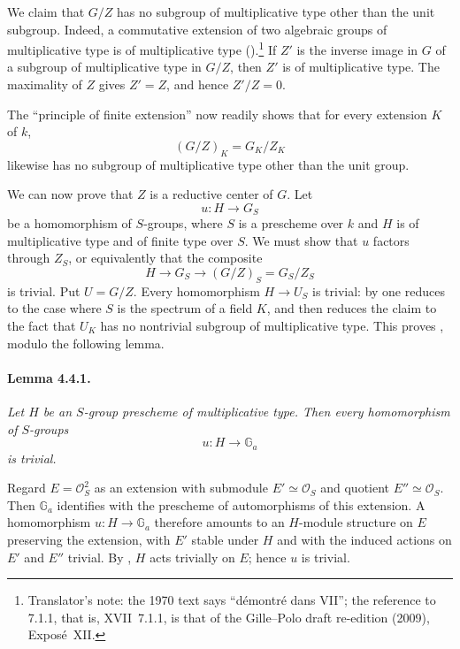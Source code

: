 We claim that \(G/Z\) has no subgroup of multiplicative type other
than the unit subgroup. Indeed, a commutative extension of two
algebraic groups of multiplicative type is of multiplicative type
().\footnote{Translator's note: the 1970
text says ``démontré dans VII''; the reference to 7.1.1, that is,
XVII~7.1.1, is that of the Gille--Polo draft re-edition (2009),
Exposé~XII.} If \(Z'\) is the inverse image in \(G\) of a subgroup of
multiplicative type in \(G/Z\), then \(Z'\) is of multiplicative
type. The maximality of \(Z\) gives \(Z'=Z\), and hence \(Z'/Z=0\).

The ``principle of finite extension'' now readily shows that for
every extension \(K\) of \(k\),
\[
  (G/Z)_K=G_K/Z_K
\]
likewise has no subgroup of multiplicative type other than the unit
group.

We can now prove that \(Z\) is a reductive center of \(G\). Let
\[
  u:H\longrightarrow G_S
\]
be a homomorphism of \(S\)-groups, where \(S\) is a prescheme over
\(k\) and \(H\) is of multiplicative type and of finite type over
\(S\). We must show that \(u\) factors through \(Z_S\), or
equivalently that the composite
\[
  H\longrightarrow G_S\longrightarrow
  (G/Z)_S=G_S/Z_S
\]
is trivial. Put \(U=G/Z\). Every homomorphism
\(H\to U_S\) is trivial: by  one reduces to the case where
\(S\) is the spectrum of a field \(K\), and  then reduces the
claim to the fact that \(U_K\) has no nontrivial subgroup of
multiplicative type. This proves , modulo the following lemma.

\paragraph{\textbf{Lemma 4.4.1.}}
\emph{Let \(H\) be an \(S\)-group prescheme of multiplicative type.
Then every homomorphism of \(S\)-groups
\[
  u:H\longrightarrow\mathbb G_a
\]
is trivial.}

Regard \(E=\mathcal O_S^2\) as an extension with submodule
\(E'\simeq\mathcal O_S\) and quotient \(E''\simeq\mathcal O_S\).
Then \(\mathbb G_a\) identifies with the prescheme of automorphisms
of this extension. A homomorphism \(u:H\to\mathbb G_a\) therefore
amounts to an \(H\)-module structure on \(E\) preserving the
extension, with \(E'\) stable under \(H\) and with the induced
actions on \(E'\) and \(E''\) trivial. By , \(H\) acts
trivially on \(E\); hence \(u\) is trivial.

